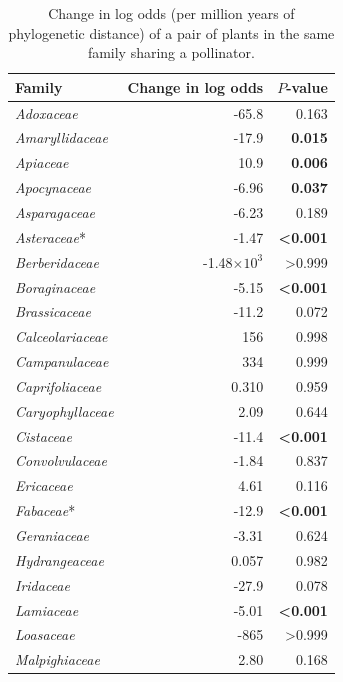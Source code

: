 \documentclass[12pt]{article}
\begin{document}
  \begin{table}[!h]
  \caption{
  \small Change in log odds (per million years of phylogenetic distance) of a pair of plants in the same family sharing a pollinator.}
  \small
  \label{family_slopes_pp}
  \begin{tabular}{|l  rr|}
    \hline
    Family  & Change in log odds & $P$-value \\
    \hline
    \emph{Adoxaceae} &  -65.8 & 0.163 \\
    \emph{Amaryllidaceae} &  -17.9 & \textbf{0.015} \\
    \emph{Apiaceae} &  10.9  & \textbf{0.006} \\
    \emph{Apocynaceae} &  -6.96  & \textbf{0.037} \\
    \emph{Asparagaceae} &  -6.23  & 0.189 \\
    \emph{Asteraceae}* &  -1.47  & \textbf{\textless0.001} \\
    \emph{Berberidaceae} &  -1.48$\times10^3$ & \textgreater0.999 \\
    \emph{Boraginaceae} &  -5.15  & \textbf{\textless0.001} \\
    \emph{Brassicaceae} &  -11.2 & 0.072 \\
    \emph{Calceolariaceae} &  156 & 0.998 \\
    \emph{Campanulaceae} &  334 & 0.999 \\
    \emph{Caprifoliaceae} &  0.310 & 0.959 \\
    \emph{Caryophyllaceae} &  2.09 & 0.644 \\
    \emph{Cistaceae} &  -11.4 & \textbf{\textless0.001} \\
    \emph{Convolvulaceae} &  -1.84  & 0.837 \\
    \emph{Ericaceae} &  4.61 & 0.116 \\
    \emph{Fabaceae}* &  -12.9 & \textbf{\textless0.001} \\
    \emph{Geraniaceae} &  -3.31  & 0.624 \\
    \emph{Hydrangeaceae} &  0.057 & 0.982 \\
    \emph{Iridaceae} &  -27.9 & 0.078 \\
    \emph{Lamiaceae} &  -5.01  & \textbf{\textless0.001} \\
    \emph{Loasaceae} &  -865  & \textgreater0.999 \\
    \emph{Malpighiaceae} &  2.80 & 0.168 \\

\end{tabular}
\end{table}
\end{document}
